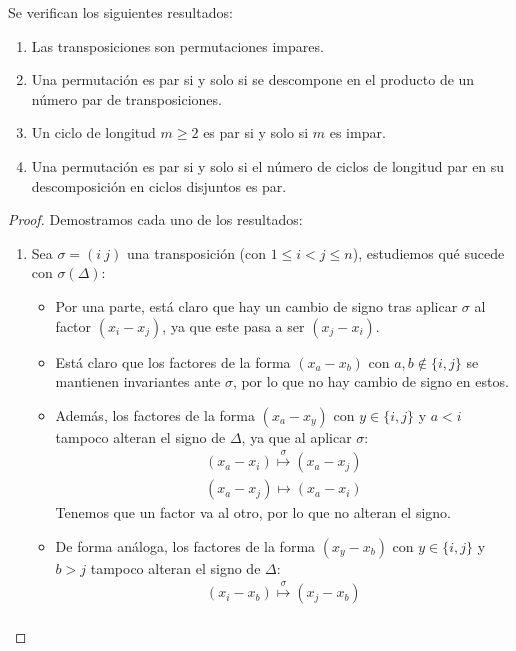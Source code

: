 \begin{coro}
    Se verifican los siguientes resultados:
    \begin{enumerate}
        \item Las transposiciones son permutaciones impares.
        \item Una permutación es par si y solo si se descompone en el producto de un número par de transposiciones.
        \item Un ciclo de longitud $m\geq 2$ es par si y solo si $m$ es impar.
        \item Una permutación es par si y solo si el número de ciclos de longitud par en su descomposición en ciclos disjuntos es par.
    \end{enumerate}
    \begin{proof}
        Demostramos cada uno de los resultados:
        \begin{enumerate}
            \item Sea $\sigma=(i\ j)$ una transposición (con $1\leq i <j\leq n$), estudiemos qué sucede con $\sigma(\Delta)$:
                \begin{itemize}
                    \item Por una parte, está claro que hay un cambio de signo tras aplicar $\sigma$ al factor $(x_i - x_j)$, ya que este pasa a ser $(x_j - x_i)$.
                    \item Está claro que los factores de la forma $(x_a - x_b)$ con $a,b \notin \{i,j\}$ se mantienen invariantes ante $\sigma$, por lo que no hay cambio de signo en estos.
                    \item Además, los factores de la forma $(x_a - x_y)$ con $y \in \{i,j\}$ y $a < i$ tampoco alteran el signo de $\Delta$, ya que al aplicar $\sigma$:
                        \begin{align*}
                            (x_a - x_i) \stackrel{\sigma}{\longmapsto} (x_a - x_j) \\
                            (x_a - x_j) \longmapsto (x_a - x_i) 
                        \end{align*}
                        Tenemos que un factor va al otro, por lo que no alteran el signo.
                    \item De forma análoga, los factores de la forma $(x_y - x_b)$ con $y \in \{i,j\}$ y $b > j$ tampoco alteran el signo de $\Delta$:
                        \begin{align*}
                            (x_i - x_b) \stackrel{\sigma}{\longmapsto} (x_j - x_b) \\

\end{align*}
\end{itemize}
\end{enumerate}
\end{proof}
\end{coro}
